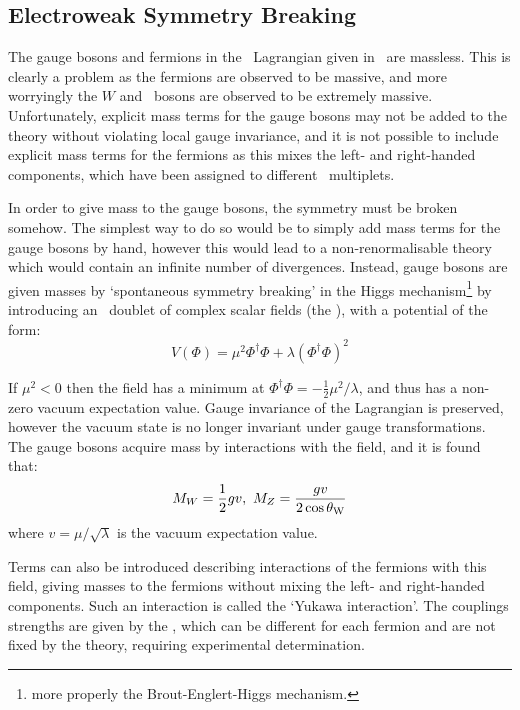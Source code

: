 \subsection{Electroweak Symmetry Breaking}

The gauge bosons and fermions in the \ew\ Lagrangian given
in~ are massless. This is clearly a problem as the fermions
are observed to be massive, and more worryingly the $W$ and \Z\ bosons are
observed to be extremely massive. Unfortunately, explicit mass terms for the
gauge bosons may not be added to the theory without violating local gauge
invariance, and it is not possible to include explicit mass terms for the
fermions as this mixes the left- and right-handed components, which have been
assigned to different \sutwo\ multiplets. 

In order to give
mass to the gauge bosons, the symmetry must be broken somehow. The simplest way
to do so would be to simply add mass terms for the gauge bosons by hand, however
this would lead to a non-renormalisable theory which would contain an infinite
number of divergences. Instead, gauge bosons are given masses by `spontaneous
symmetry breaking' in the Higgs mechanism\footnote{more properly the Brout-Englert-Higgs
mechanism.} by introducing an \sutwo\ doublet of complex scalar fields (the ), with a potential of the form:
\begin{equation}
V(\Phi) =  \mu^{2}\Phi^{\dagger}\Phi + \lambda(\Phi^{\dagger}\Phi)^{2}
\end{equation}

If $\mu^{2} < 0$ then the field has a minimum at $\Phi^{\dagger}\Phi = -
\frac{1}{2} \mu^{2}/\lambda$, and thus has a non-zero vacuum expectation value. 
Gauge invariance of the Lagrangian is preserved, however the vacuum state is no
longer invariant under gauge transformations.
The gauge bosons acquire mass by interactions with the field, and it is found
that:
\begin{equation}
M_{W} = \frac{1}{2}gv, \ M_{Z} = \frac{gv}{2 \cos{\ensuremath{\theta_{\mathrm{W}}}}}
\end{equation}
where $v = \mu / \sqrt{\lambda}$ is the vacuum expectation value. 

Terms can also be
introduced describing interactions of the fermions with this field, giving
masses to the fermions without mixing the left- and right-handed components.
Such an interaction is called the `Yukawa interaction'. The couplings strengths
are given by the , which can be different for each
fermion and are not fixed by the theory, requiring experimental determination. 

